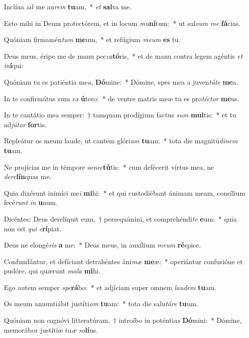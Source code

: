 \item Inclína ad me au\textit{rem} \textbf{tu}am,~* \textit{et} \textbf{sal}va me.
\item Esto mihi in Deum protectórem, et in locum \textit{mu}\textbf{ní}tum:~* ut sal\textit{vum} \textit{me} \textbf{fá}cias.
\item Quóniam firmamén\textit{tum} \textbf{me}um,~* et refúgium \textit{me}\textit{um} \textbf{es} tu.
\item Deus meus, éripe me de manu pec\textit{ca}\textbf{tó}ris,~* et de manu contra legem agéntis \textit{et} \textit{in}\textbf{í}qui:
\item Quóniam tu es patiéntia me\textit{a}, \textbf{Dó}mine:~* Dómine, spes mea a juven\textit{tú}\textit{te} \textbf{me}a.
\item In te confirmátus sum \textit{ex} \textbf{ú}tero:~* de ventre matris meæ tu es pro\textit{téc}\textit{tor} \textbf{me}us.
\item In te cantátio mea semper:~† tamquam prodígium factus \textit{sum} \textbf{mul}tis:~* et tu ad\textit{jú}\textit{tor} \textbf{for}tis.
\item Repleátur os meum laude, ut cantem glóri\textit{am} \textbf{tu}am:~* tota die magnitú\textit{di}\textit{nem} \textbf{tu}am.
\item Ne projícias me in témpore se\textit{nec}\textbf{tú}tis:~* cum defécerit virtus mea, ne \textit{de}\textit{re}\textbf{lín}quas me.
\item Quia dixérunt inimíci me\textit{i} \textbf{mi}hi:~* et qui custodiébant ánimam meam, consílium fecé\textit{runt} \textit{in} \textbf{u}num.
\item Dicéntes: Deus derelíquit eum,~† persequímini, et comprehéndi\textit{te} \textbf{e}um:~* quia non est \textit{qui} \textit{e}\textbf{rí}piat.
\item Deus ne elongé\textit{ris} \textbf{a} me:~* Deus meus, in auxílium \textit{me}\textit{um} \textbf{ré}spice.
\item Confundántur, et defíciant detrahéntes áni\textit{mæ} \textbf{me}æ:~* operiántur confusióne et pudóre, qui quærunt \textit{ma}\textit{la} \textbf{mi}hi.
\item Ego autem semper \textit{spe}\textbf{rá}bo:~* et adjíciam super omnem \textit{lau}\textit{dem} \textbf{tu}am.
\item Os meum annuntiábit justíti\textit{am} \textbf{tu}am:~* tota die salu\textit{tá}\textit{re} \textbf{tu}um.
\item Quóniam non cognóvi litteratúram,~† introíbo in poténti\textit{as} \textbf{Dó}mini:~* Dómine, memorábor justítiæ tu\textit{æ} \textit{so}\textbf{lí}us.

